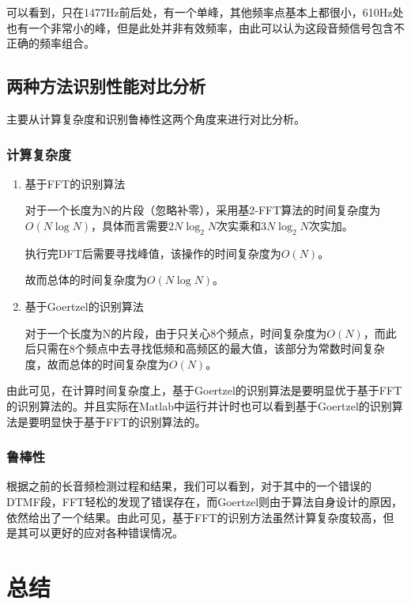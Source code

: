 \documentclass[10pt, a4paper]{article}
\begin{document}
可以看到，只在1477Hz前后处，有一个单峰，其他频率点基本上都很小，610Hz处也有一个非常小的峰，但是此处并非有效频率，由此可以认为这段音频信号包含不正确的频率组合。

\subsection{两种方法识别性能对比分析}

主要从计算复杂度和识别鲁棒性这两个角度来进行对比分析。

\subsubsection{计算复杂度}

\begin{enumerate}
    \item 基于FFT的识别算法
    
    对于一个长度为N的片段（忽略补零），采用基2-FFT算法的时间复杂度为$O(N\log N)$，具体而言需要$2N\log_2 N$次实乘和$3N\log_2 N$次实加。
    
    执行完DFT后需要寻找峰值，该操作的时间复杂度为$O(N)$。
    
    故而总体的时间复杂度为$O(N\log N)$。
    
    \item 基于Goertzel的识别算法
    
    对于一个长度为N的片段，由于只关心8个频点，时间复杂度为$O(N)$，而此后只需在8个频点中去寻找低频和高频区的最大值，该部分为常数时间复杂度，故而总体的时间复杂度为$O(N)$。
    
\end{enumerate}

由此可见，在计算时间复杂度上，基于Goertzel的识别算法是要明显优于基于FFT的识别算法的。并且实际在Matlab中运行并计时也可以看到基于Goertzel的识别算法是要明显快于基于FFT的识别算法的。

\subsubsection{鲁棒性}

根据之前的长音频检测过程和结果，我们可以看到，对于其中的一个错误的DTMF段，FFT轻松的发现了错误存在，而Goertzel则由于算法自身设计的原因，依然给出了一个结果。由此可见，基于FFT的识别方法虽然计算复杂度较高，但是其可以更好的应对各种错误情况。

\section{总结}
\end{document}
